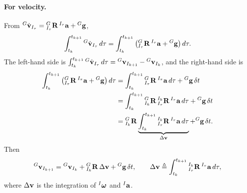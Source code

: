 \paragraph{For velocity.} From ${}^{G}\dot{\boldsymbol{\mathbf{v}}}_{I_\tau} = {}^{G}_{I_\tau}\boldsymbol{\mathbf{R}}\,{}^{I_\tau}\boldsymbol{\mathbf{a}} + {}^{G}\boldsymbol{\mathbf{g}}$,
\begin{align}
\int_{t_k}^{t_{k+1}} {}^{G}\dot{\boldsymbol{\mathbf{v}}}_{I_\tau}\,d\tau
= \int_{t_k}^{t_{k+1}} \big({}^{G}_{I_\tau}\boldsymbol{\mathbf{R}}\,{}^{I_\tau}\boldsymbol{\mathbf{a}} + {}^{G}\boldsymbol{\mathbf{g}}\big)\,d\tau.
\end{align}
The left-hand side is $\int_{t_k}^{t_{k+1}} {}^{G}\dot{\boldsymbol{\mathbf{v}}}_{I_\tau}\,d\tau = {}^{G}\boldsymbol{\mathbf{v}}_{I_{k+1}} - {}^{G}\boldsymbol{\mathbf{v}}_{I_k}$, and the right-hand side is
\begin{align}
\int_{t_k}^{t_{k+1}} \big({}^{G}_{I_\tau}\boldsymbol{\mathbf{R}}\,{}^{I_\tau}\boldsymbol{\mathbf{a}} + {}^{G}\boldsymbol{\mathbf{g}}\big)\,d\tau
&= \int_{t_k}^{t_{k+1}} {}^{G}_{I_\tau}\boldsymbol{\mathbf{R}}\,{}^{I_\tau}\boldsymbol{\mathbf{a}}\,d\tau + {}^{G}\boldsymbol{\mathbf{g}}\,\delta t \\
&= \int_{t_k}^{t_{k+1}} {}^{G}_{I_k}\boldsymbol{\mathbf{R}}\,{}^{I_k}_{I_\tau}\boldsymbol{\mathbf{R}}\,{}^{I_\tau}\boldsymbol{\mathbf{a}}\,d\tau + {}^{G}\boldsymbol{\mathbf{g}}\,\delta t \\
&= {}^{G}_{I_k}\boldsymbol{\mathbf{R}} \underbrace{\int_{t_k}^{t_{k+1}} {}^{I_k}_{I_\tau}\boldsymbol{\mathbf{R}}\,{}^{I_\tau}\boldsymbol{\mathbf{a}}\,d\tau}_{\Delta\boldsymbol{\mathbf{v}}} + {}^{G}\boldsymbol{\mathbf{g}}\,\delta t.
\end{align}
Then
\begin{align}
{}^{G}\boldsymbol{\mathbf{v}}_{I_{k+1}} = {}^{G}\boldsymbol{\mathbf{v}}_{I_k} + {}^{G}_{I_k}\boldsymbol{\mathbf{R}}\,\Delta\boldsymbol{\mathbf{v}} + {}^{G}\boldsymbol{\mathbf{g}}\,\delta t,
\qquad
\Delta\boldsymbol{\mathbf{v}} \triangleq \int_{t_k}^{t_{k+1}} {}^{I_k}_{I_\tau}\boldsymbol{\mathbf{R}}\,{}^{I_\tau}\boldsymbol{\mathbf{a}}\,d\tau,
\end{align}
where $\Delta\boldsymbol{\mathbf{v}}$ is the integration of ${}^{I}\boldsymbol{\mathbf{\omega}}$ and ${}^{I}\boldsymbol{\mathbf{a}}$.

